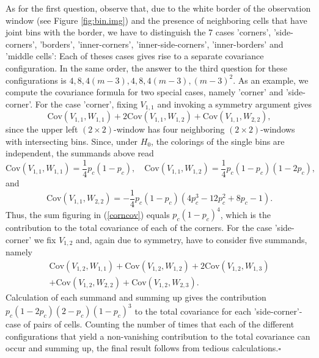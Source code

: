 \documentclass[12pt]{article}
\begin{document}
As for the first question, observe that, due to the white border of the observation window (see Figure \ref{fig:bin.img}) and the presence of neighboring cells that have joint bins with the border, we have to distinguish the 7 cases 'corners', 'side-corners', 'borders', 'inner-corners', 'inner-side-corners', 'inner-borders' and 'middle cells': Each of theses cases gives rise to a separate covariance configuration. In the same order, the answer to the third question for these configurations is $4,8,4(m-3),4,8,4(m-3),(m-3)^2$. As an example, we compute the covariance formula for two special cases, namely 'corner' and 'side-corner'. For the case 'corner', fixing $V_{1,1}$ and invoking a symmetry argument gives
\begin{equation}\label{corncov}
\mbox{Cov}(V_{1,1},W_{1,1})+2\mbox{Cov}(V_{1,1},W_{1,2})+\mbox{Cov}(V_{1,1},W_{2,2}),
\end{equation}
since the upper left $(2\times2)$-window has four neighboring $(2\times2)$-windows with intersecting bins.
Since, under $H_0$, the colorings of the single bins are independent, the summands above read
\begin{equation*}
\mbox{Cov}(V_{1,1},W_{1,1})=\frac14p_c(1-p_c), \quad \mbox{Cov}(V_{1,1},W_{1,2})=\frac14p_c(1-p_c)(1-2p_c),
\end{equation*}
and
\begin{equation*}
\mbox{Cov}(V_{1,1},W_{2,2})=-\frac14p_c(1-p_c)(4p_c^3-12p_c^2+8p_c-1).
\end{equation*}
Thus, the sum figuring in (\ref{corncov}) equals $p_c(1-p_c)^4$, which is the contribution to the total covariance of each of the corners. For the case 'side-corner' we fix $V_{1,2}$ and, again due to symmetry, have to consider five summands, namely
\begin{eqnarray*}
\mbox{Cov}(V_{1,2},W_{1,1})+\mbox{Cov}(V_{1,2},W_{1,2})+2\mbox{Cov}(V_{1,2},W_{1,3})\\
+\mbox{Cov}(V_{1,2},W_{2,2})+\mbox{Cov}(V_{1,2},W_{2,3}).
\end{eqnarray*}
Calculation of each summand and summing up gives the contribution $p_c(1-2p_c)(2-p_c)(1-p_c)^3$ to the total covariance for each 'side-corner'-case of pairs of cells. Counting the number of times that each of the different configurations that yield a non-vanishing contribution to the total covariance can occur and summing up, the final result follows from tedious calculations.\hfill$\square$\\
\end{document}
